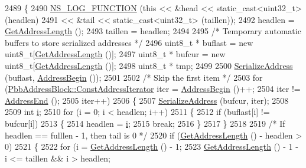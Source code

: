 \begin{DoxyCode}
2489 \{
2490   \hyperlink{log-macros-disabled_8h_a90b90d5bad1f39cb1b64923ea94c0761}{NS\_LOG\_FUNCTION} (\textcolor{keyword}{this} << &head << static\_cast<uint32\_t> (headlen)
2491                    << &tail << static\_cast<uint32\_t> (taillen));
2492   headlen = \hyperlink{classns3_1_1PbbAddressBlock_a0b96213a92a072027cc96a2e41c8eb24}{GetAddressLength} ();
2493   taillen = headlen;
2494 
2495   \textcolor{comment}{/* Temporary automatic buffers to store serialized addresses */}
2496   uint8\_t * buflast = \textcolor{keyword}{new} uint8\_t[\hyperlink{classns3_1_1PbbAddressBlock_a0b96213a92a072027cc96a2e41c8eb24}{GetAddressLength} ()];
2497   uint8\_t * bufcur = \textcolor{keyword}{new} uint8\_t[\hyperlink{classns3_1_1PbbAddressBlock_a0b96213a92a072027cc96a2e41c8eb24}{GetAddressLength} ()];
2498   uint8\_t * tmp;
2499 
2500   \hyperlink{classns3_1_1PbbAddressBlock_a53207832167cad2ee8a7783f318c44aa}{SerializeAddress} (buflast, \hyperlink{classns3_1_1PbbAddressBlock_a3eb4e97961cf32ffc66692ed2e9e8774}{AddressBegin} ());
2501 
2502   \textcolor{comment}{/* Skip the first item */}
2503   \textcolor{keywordflow}{for} (\hyperlink{classns3_1_1PbbAddressBlock_ac1f10df8f85c0c8d4b729352bc32a7cf}{PbbAddressBlock::ConstAddressIterator} iter = 
      \hyperlink{classns3_1_1PbbAddressBlock_a3eb4e97961cf32ffc66692ed2e9e8774}{AddressBegin} ()++;
2504        iter != \hyperlink{classns3_1_1PbbAddressBlock_acf5ebced174e6605bff8cb3a439a81ae}{AddressEnd} ();
2505        iter++)
2506     \{
2507       \hyperlink{classns3_1_1PbbAddressBlock_a53207832167cad2ee8a7783f318c44aa}{SerializeAddress} (bufcur, iter);
2508 
2509       \textcolor{keywordtype}{int} \hyperlink{bernuolliDistribution_8m_a6f6ccfcf58b31cb6412107d9d5281426}{i};
2510       \textcolor{keywordflow}{for} (i = 0; i < headlen; i++)
2511         \{
2512           \textcolor{keywordflow}{if} (buflast[i] != bufcur[i])
2513             \{
2514               headlen = \hyperlink{bernuolliDistribution_8m_a6f6ccfcf58b31cb6412107d9d5281426}{i};
2515               \textcolor{keywordflow}{break};
2516             \}
2517         \}
2518 
2519       \textcolor{comment}{/* If headlen == fulllen - 1, then tail is 0 */}
2520       \textcolor{keywordflow}{if} (\hyperlink{classns3_1_1PbbAddressBlock_a0b96213a92a072027cc96a2e41c8eb24}{GetAddressLength} () - headlen > 0)
2521         \{
2522           \textcolor{keywordflow}{for} (i = \hyperlink{classns3_1_1PbbAddressBlock_a0b96213a92a072027cc96a2e41c8eb24}{GetAddressLength} () - 1;
2523                \hyperlink{classns3_1_1PbbAddressBlock_a0b96213a92a072027cc96a2e41c8eb24}{GetAddressLength} () - 1 - i <= taillen && i > headlen;

\end{DoxyCode}
